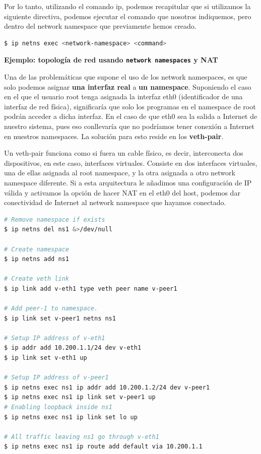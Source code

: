 \documentclass[12pt]{article}
\begin{document}
	\par \noindent Por lo tanto, utilizando el comando ip, podemos recapitular que si utilizamos la siguiente directiva, podemos ejecutar el comando que nosotros indiquemos, pero dentro del network namespace que previamente hemos creado.
	\begin{lstlisting}[language=bash, caption=Ejecutar cualquier programa con un network namespace]
$ ip netns exec <network-namespace> <command>
	\end{lstlisting}

	\pagebreak
	
	\noindent \textbf{\large Ejemplo: topología de red usando \texttt{network namespaces} y NAT}\\
	\par \noindent Una de las problemáticas que supone el uso de los network namespaces, es que solo podemos asignar \textbf{una interfaz real} a \textbf{un namespace}. Suponiendo el caso en el que el usuario root tenga asignada la interfaz eth0 (identificador de una interfaz de red física), significaría que solo los programas en el namespace de root podrán acceder a dicha interfaz. En el caso de que eth0 sea la salida a Internet de nuestro sistema, pues eso conllevaría que no podríamos tener conexión a Internet en nuestros namespaces. La solución para esto reside en los \textbf{veth-pair}.
	
	\addvspace{10px}
	
	\par \noindent Un veth-pair funciona como si fuera un cable físico, es decir, interconecta dos dispositivos, en este caso, interfaces virtuales. Consiste en dos interfaces virtuales, una de ellas asignada al root namespace, y la otra asignada a otro network namespace diferente. Si a esta arquitectura le añadimos una configuración de IP válida y activamos la opción de hacer NAT en el eth0 del host, podemos dar conectividad de Internet al network namespace que hayamos conectado.
	
	\addvspace{10px}
	
	\begin{lstlisting}[language=bash, caption=Ejemplo configuración de NAT entre eth0 y veth]
# Remove namespace if exists
$ ip netns del ns1 &>/dev/null

# Create namespace
$ ip netns add ns1

# Create veth link
$ ip link add v-eth1 type veth peer name v-peer1

# Add peer-1 to namespace.
$ ip link set v-peer1 netns ns1

# Setup IP address of v-eth1
$ ip addr add 10.200.1.1/24 dev v-eth1
$ ip link set v-eth1 up

# Setup IP address of v-peer1
$ ip netns exec ns1 ip addr add 10.200.1.2/24 dev v-peer1
$ ip netns exec ns1 ip link set v-peer1 up
# Enabling loopback inside ns1
$ ip netns exec ns1 ip link set lo up

# All traffic leaving ns1 go through v-eth1
$ ip netns exec ns1 ip route add default via 10.200.1.1
	\end{lstlisting}
\end{document}
